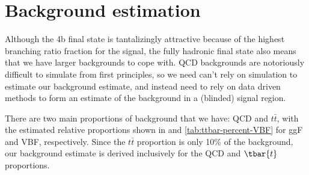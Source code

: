 \chapter{Background estimation}

Although the 4b final state is tantalizingly attractive because of the highest branching ratio fraction for the signal,  the fully hadronic final state also means that we have larger backgrounds to cope with. QCD backgrounds are notoriously difficult to simulate from first principles, so we need can't rely on simulation to estimate our background estimate, and instead need to rely on data driven methods to form an estimate of the background in a (blinded) signal region.


There are two main proportions of background that we have: QCD and $t\bar{t}$, with the estimated relative proportions shown in \Tab{\ref{tab:ttbar-percent-ggF-4b}} and \ref{tab:ttbar-percent-VBF} for ggF and VBF, respectively. Since the $t\bar{t}$ proportion is only 10\% of the background, our background estimate is derived inclusively for the QCD and $\tbar{t}$ proportions.

\begin{table}[h]
	\centering
	\caption{Percentage of the data-driven background estimate expected to be composed of \ttbar events for the ggF 4b (left) and VBF 4b categories (right).}
\end{table}


